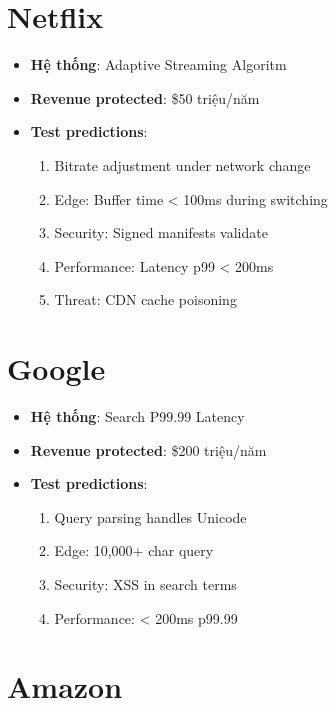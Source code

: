 \documentclass[12pt,a4paper]{report}
\begin{document}
\section{Netflix}

\begin{itemize}
    \item \textbf{Hệ thống}: Adaptive Streaming Algoritm
    \item \textbf{Revenue protected}: \$50 triệu/năm
    \item \textbf{Test predictions}:
    \begin{enumerate}
        \item Bitrate adjustment under network change
        \item Edge: Buffer time < 100ms during switching
        \item Security: Signed manifests validate
        \item Performance: Latency p99 < 200ms
        \item Threat: CDN cache poisoning
    \end{enumerate}
\end{itemize}

\section{Google}

\begin{itemize}
    \item \textbf{Hệ thống}: Search P99.99 Latency
    \item \textbf{Revenue protected}: \$200 triệu/năm
    \item \textbf{Test predictions}:
    \begin{enumerate}
        \item Query parsing handles Unicode
        \item Edge: 10,000+ char query
        \item Security: XSS in search terms
        \item Performance: < 200ms p99.99
    \end{enumerate}
\end{itemize}

\section{Amazon}
\end{document}
